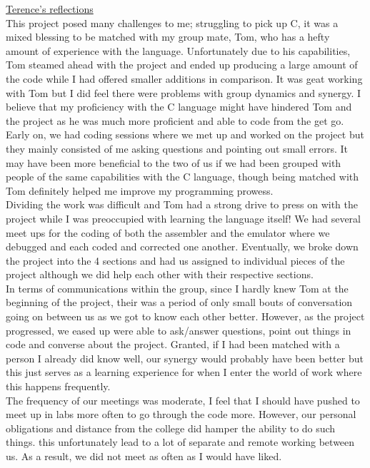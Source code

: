 \documentclass[11pt]{article}
\begin{document}
\noindent\underline{Terence's reflections}
\\ 
\indent This project posed many challenges to me; struggling to pick up C, it was a mixed blessing to be matched with my group mate, Tom, who has a hefty amount of experience with the language. Unfortunately due to his capabilities, Tom steamed ahead with the project and ended up producing  a large amount of the code while I had offered smaller additions in comparison. 
It was geat working with Tom but I did feel there were problems with group dynamics and synergy. I believe that my proficiency with the C language might have hindered Tom and the project as he was much more proficient and able to code from the get go. Early on, we had coding sessions where we met up and worked on the project but they mainly consisted of me asking questions and pointing out small errors. It may have been more beneficial to the two of us if we had been grouped with people of the same capabilities with the C language, though being matched with Tom definitely helped me improve my programming prowess. 
\\
\indent Dividing the work was difficult and Tom had a strong drive to press on with the project while I was preoccupied with learning the language itself! We had several meet ups for the coding of both the assembler and the emulator where we debugged and each coded and corrected one another. Eventually, we broke down the project into the 4 sections and had us assigned to individual pieces of the project although we did help each other with their respective sections.
\\
\indent In terms of communications within the group, since I hardly knew Tom at the beginning of the project, their was a period of only small bouts of conversation going on between us as we got to know each other better. However, as the project progressed, we eased up were able to ask/answer questions, point out things in code and converse about the project. Granted, if I had been matched with a person I already did know well, our synergy would probably have been better but this just serves as a learning experience for when I enter the world of work where this happens frequently.
\\
\indent The frequency of our meetings was moderate, I feel that I should have pushed to meet up in labs more often to go through the code more. However, our personal obligations and distance from the college did hamper the ability to do such things. this unfortunately lead to a lot of separate and remote working between us. As a result, we did not meet as often as I would have liked.
\end{document}

